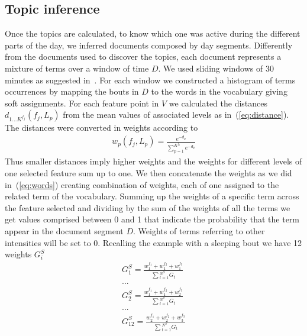 \subsection{Topic inference}\label{subsec:topicinf}
Once the topics are calculated, to know which one was active during the different parts of the day, we inferred documents composed by day segments. Differently from the documents used to discover the topics, each document represents a mixture of terms over a window of time $D$. We used sliding windows of 30 minutes as suggested in~\cite{Seiter_2014}. 
For each window we constructed a histogram of terms occurrences by mapping the bouts in $D$ to the words in the vocabulary giving soft assignments. For each feature point in $V$ we calculated the distances $d_{1...K^{f_{j}}}({f_{j},L_{p}})$ from the mean values of associated levels as in~(\ref{eq:distance}).
The distances were converted in weights according to
\begin{eqnarray}
w_{p}(f_{j},L_{p})=\frac{e^{-d_{p}}}{\sum_{p=1}^{K^{f_{j}}} e^{-d_{p}}}
\end{eqnarray}
Thus smaller distances imply higher weights and the weights for different levels of one selected feature sum up to one. 
We then concatenate the weights as we did in~(\ref{eq:words}) creating combination of weights, each of one assigned to the related term of the vocabulary. 
Summing up the weights of a specific term across the feature selected and dividing by the sum of the weights of all the terms we get values comprised between 0 and 1 that indicate the probability that the term appear in the document segment $D$. Weights of terms referring to other intensities will be set to 0.
Recalling the example with a sleeping bout we have 12 weights $G_{i}^{S}$
\begin{eqnarray}
G^{S}_{1}=\frac{w_{1}^{f_{1}}+w_{1}^{f_{2}}+w_{1}^{f_{3}}}{\sum{_{t=1}^{N^{S}}}G_{t}}\nonumber\\
...\nonumber\\
G^{S}_{2}=\frac{w_{1}^{f_{1}}+w_{1}^{f_{2}}+w_{2}^{f_{3}}}{\sum{_{t=1}^{N^{S}}}G_{t}}\nonumber\\
...\nonumber\\
G^{S}_{12}=\frac{w_{2}^{f_{1}}+w_{2}^{f_{2}}+w_{3}^{f_{3}}}{\sum{_{t=1}^{N^{S}}}G_{t}}\nonumber\\
\end{eqnarray}
